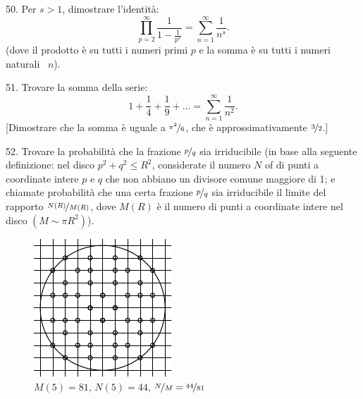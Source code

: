 \begin{problem}{50.}
	Per $s>1$, dimostrare l’identità:
	\begin{equation*}
		\textstyle\prod\limits_{p=2}^{\infty} \frac{1}{1-\frac{1}{p^s}}=\textstyle\sum\limits_{n=1}^{\infty} \frac{1}{n^s}.
	\end{equation*}
	(dove il prodotto è su tutti i numeri primi $p$ e la somma è su tutti i numeri naturali ~$n$).
\end{problem}

\begin{problem}{51.}
	Trovare la somma della serie:
	\begin{equation*}
		1+ \frac{1}{4}+ \frac{1}{9}+\dots=\textstyle\sum\limits_{n=1}^{\infty} \frac{1}{n^2}.
	\end{equation*}
	[Dimostrare che la somma è uguale a $\nicefrac{\pi^2}{6}$, che è approssimativamente  $\nicefrac{3}{2}$.] 
\end{problem}

\begin{problem}{52.} 
	Trovare la probabilità che la frazione  $\nicefrac{p}{q}$ sia irriducibile (in base alla seguente definizione:
	nel disco $p^2+q^2 \leqslant R^2$, considerate il numero $N$ of di punti a coordinate intere $p$ e $q$ che non abbiano un divisore comune maggiore di 1; e chiamate probabilità che una certa frazione $\nicefrac{p}{q}$ sia irriducibile il limite del rapporto $\nicefrac{N(R)}{M(R)}$, dove $M(R)$ è il numero di punti a coordinate intere nel disco $(M \sim \pi R^2)$).
	\begin{figure}
		\includegraphics{resources/taskbook-36}\\
		\footnotesize $M(5)=81$, $N(5)=44$, $\nicefrac{N}{M} = \nicefrac{44}{81}$
	\end{figure}
\end{problem}

